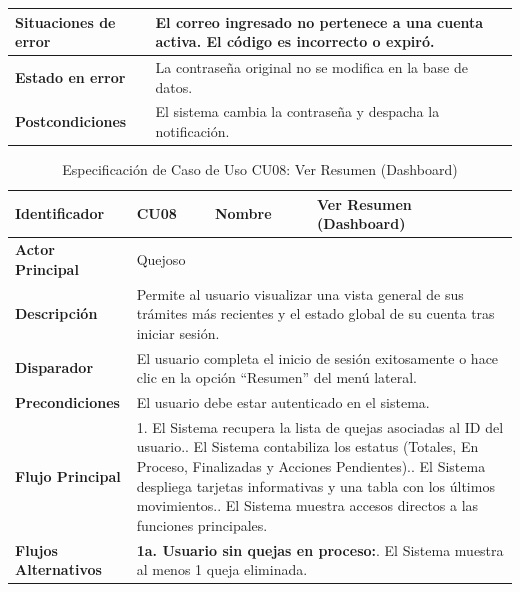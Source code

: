 \begin{longtable}{|p{3.5cm}|p{2cm}|p{2.5cm}|p{7cm}|}
\textbf{Situaciones de error} & \multicolumn{3}{p{11.5cm}|}{El correo ingresado no pertenece a una cuenta activa. El código es incorrecto o expiró.} \\ \hline
\textbf{Estado en error} & \multicolumn{3}{p{11.5cm}|}{La contraseña original no se modifica en la base de datos.} \\ \hline
\textbf{Postcondiciones} & \multicolumn{3}{p{11.5cm}|}{El sistema cambia la contraseña y despacha la notificación.} \\ \hline
\end{longtable}
\endgroup

\vspace{0.8cm}

\begingroup
\setlength{\parskip}{0pt}
\begin{longtable}{|p{3.5cm}|p{2cm}|p{2.5cm}|p{7cm}|}
\caption{Especificación de Caso de Uso CU08: Ver Resumen (Dashboard)}
\label{tab:cu08_ver_resumen} \\
\hline
\textbf{Identificador} & CU08 & \textbf{Nombre} & Ver Resumen (Dashboard) \\ \hline
\textbf{Actor Principal} & \multicolumn{3}{p{11.5cm}|}{Quejoso} \\ \hline
\textbf{Descripción} & \multicolumn{3}{p{11.5cm}|}{Permite al usuario visualizar una vista general de sus trámites más recientes y el estado global de su cuenta tras iniciar sesión.} \\ \hline
\textbf{Disparador} & \multicolumn{3}{p{11.5cm}|}{El usuario completa el inicio de sesión exitosamente o hace clic en la opción ``Resumen'' del menú lateral.} \\ \hline
\textbf{Precondiciones} & \multicolumn{3}{p{11.5cm}|}{El usuario debe estar autenticado en el sistema.} \\ \hline
\textbf{Flujo Principal} & \multicolumn{3}{p{11.5cm}|}{1. El Sistema recupera la lista de quejas asociadas al ID del usuario.\newline 2. El Sistema contabiliza los estatus (Totales, En Proceso, Finalizadas y Acciones Pendientes).\newline 3. El Sistema despliega tarjetas informativas y una tabla con los últimos movimientos.\newline 4. El Sistema muestra accesos directos a las funciones principales.} \\ \hline
\textbf{Flujos Alternativos} & \multicolumn{3}{p{11.5cm}|}{\textbf{1a. Usuario sin quejas en proceso:}\newline 1. El Sistema muestra al menos 1 queja eliminada.} \\ \hline

\end{longtable}
